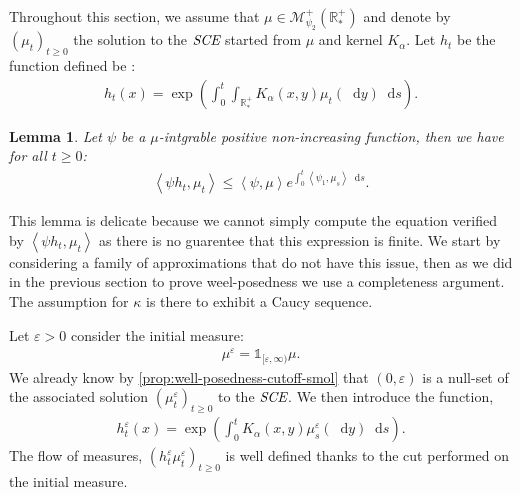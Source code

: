 \documentclass[11pt,a4paper]{article}
\newcommand{\RRP}{\mathbb{R}^+_*}
\newcommand{\MC}{\mathcal{M}}
\newcommand{\SCE}{\emph{SCE}}
\newcommand{\Proc}[1]{\left(#1\right)_{t\geq 0}}
\newcommand{\brac}[1]{\left\langle#1\right\rangle}
\newcommand{\dd}{\mathop{}\!\mathrm{d}}
\newtheorem{lemma}[theorem]{Lemma}
\begin{document}
Throughout this section, we assume that $\mu \in \MC^+_{\psi_2}(\RRP)$ and denote by $\Proc{\mu_t}$ the solution to the $\SCE$ started from $\mu$ and kernel $K_\alpha$. Let $h_t$ be the function defined be :
\begin{align*}
    h_t(x) = \exp\left(\int_0^t\int_{\RRP} K_\alpha(x,y) \mu_t(\dd y)\dd s\right).
\end{align*}
\begin{lemma}\label{lem:exponential-moments}
    Let $\psi$ be a $\mu$-intgrable positive non-increasing function, then we have for all $t \geq 0$:
    \begin{align*}
        \brac{\psi h_t,\mu_t} \leq \brac{\psi,\mu}e^{\int_0^t \brac{\psi_1,\mu_s}\dd s} .
    \end{align*}
\end{lemma}
This lemma is delicate because we cannot simply compute the equation verified by $\brac{\psi h_t,\mu_t}$ as there is no guarentee that this expression is finite. We start by considering a family of approximations that do not have this issue, then as we did in the previous section to prove weel-posedness we use a completeness argument. The assumption for $\kappa$ is there to exhibit a Caucy sequence.

Let $\varepsilon > 0$ consider the initial measure:
\begin{align*}
    \mu^\varepsilon = \mathds{1}_{[\varepsilon,\infty)}\mu.
\end{align*}
We already know by \ref{prop:well-posedness-cutoff-smol} that $(0,\varepsilon)$ is a null-set of the associated solution $\Proc{\mu_t^\varepsilon}$ to the $\SCE$. We then introduce the function,
\begin{align*}
    h_t^\varepsilon(x) = \exp{\left(\int_0^t K_\alpha(x,y)\mu_s^\varepsilon(\dd y) \dd s \right)}.
\end{align*}
The flow of measures, $\Proc{h_t^\varepsilon\mu_t^\varepsilon}$ is well defined thanks to the cut performed on the initial measure.
\end{document}
